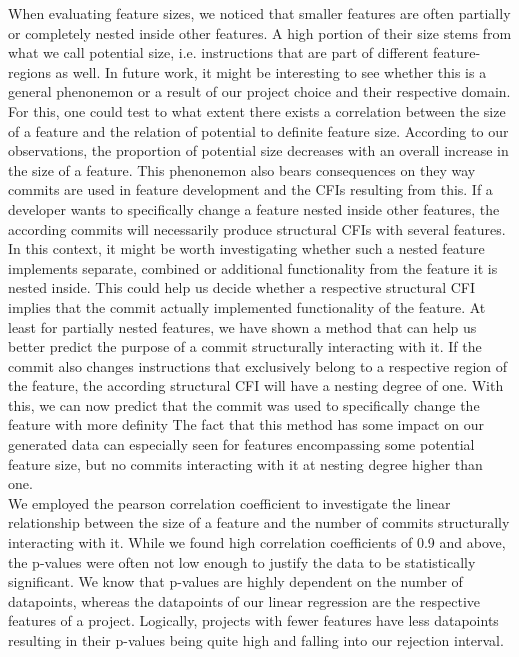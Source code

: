 When evaluating feature sizes, we noticed that smaller features are often partially or completely nested inside other features.
A high portion of their size stems from what we call potential size, i.e. instructions that are part of different feature-regions as well.
In future work, it might be interesting to see whether this is a general phenonemon or a result of our project choice and their respective domain.
For this, one could test to what extent there exists a correlation between the size of a feature and the relation of potential to definite feature size.
According to our observations, the proportion of potential size decreases with an overall increase in the size of a feature.
This phenonemon also bears consequences on they way commits are used in feature development and the CFIs resulting from this.
If a developer wants to specifically change a feature nested inside other features, the according commits will necessarily produce structural CFIs with several features.
In this context, it might be worth investigating whether such a nested feature implements separate, combined or additional functionality from the feature it is nested inside.
This could help us decide whether a respective structural CFI implies that the commit actually implemented functionality of the feature.
At least for partially nested features, we have shown a method that can help us better predict the purpose of a commit structurally interacting with it.
If the commit also changes instructions that exclusively belong to a respective region of the feature, the according structural CFI will have a nesting degree of one.
With this, we can now predict that the commit was used to specifically change the feature with more definity
The fact that this method has some impact on our generated data can especially seen for features encompassing some potential feature size, but no commits interacting with it at nesting degree higher than one.\\
We employed the pearson correlation coefficient to investigate the linear relationship between the size of a feature and the number of commits structurally interacting with it.
While we found high correlation coefficients of 0.9 and above, the p-values were often not low enough to justify the data to be statistically significant.
We know that p-values are highly dependent on the number of datapoints, whereas the datapoints of our linear regression are the respective features of a project.
Logically, projects with fewer features have less datapoints resulting in their p-values being quite high and falling into our rejection interval.
